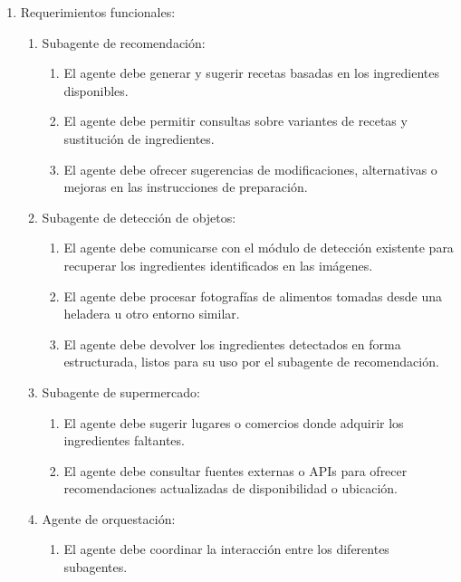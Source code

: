 \documentclass[
11pt, %
]{charter}
\begin{document}
\begin{enumerate}
	\item Requerimientos funcionales:
	\begin{enumerate}
		\item Subagente de recomendación:
        \begin{enumerate}
            \item El agente debe generar y sugerir recetas basadas en los ingredientes disponibles.
            \item El agente debe permitir consultas sobre variantes de recetas y sustitución de ingredientes.
            \item El agente debe ofrecer sugerencias de modificaciones, alternativas o mejoras en las instrucciones de preparación.
        \end{enumerate}

        \item Subagente de detección de objetos:
        \begin{enumerate}
            \item El agente debe comunicarse con el módulo de detección existente para recuperar los ingredientes identificados en las imágenes.
            \item El agente debe procesar fotografías de alimentos tomadas desde una heladera u otro entorno similar.
            \item El agente debe devolver los ingredientes detectados en forma estructurada, listos para su uso por el subagente de recomendación.
        \end{enumerate}

        \item Subagente de supermercado:
        \begin{enumerate}
            \item El agente debe sugerir lugares o comercios donde adquirir los ingredientes faltantes.
            \item El agente debe consultar fuentes externas o APIs para ofrecer recomendaciones actualizadas de disponibilidad o ubicación.
        \end{enumerate}

		
       \item Agente de orquestación:
        \begin{enumerate}
            \item El agente debe coordinar la interacción entre los diferentes subagentes.
        \end{enumerate}
    


\end{enumerate}
\end{enumerate}
\end{document}
